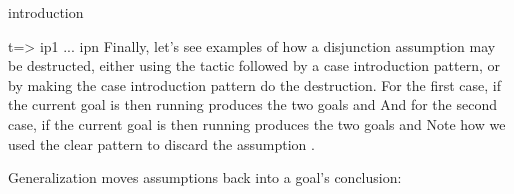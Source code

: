 \begin{tactic}[$t$ =>$\;\iota_1 \cdots \iota_n$]{introduction}
\begin{tsyntax}[empty]{t=> ip1 ... ipn}
    Finally, let's see examples of how a disjunction assumption
    may be destructed, either using the  tactic followed
    by a case introduction pattern, or by making the
    case introduction pattern do the destruction.
    For the first case, if the current goal is
    then running
    produces the two goals
    and
    And for the second case, if the current goal is
    then running
    produces the two goals
    and
    Note how we used the clear pattern to discard the assumption
    .
  \end{tsyntax}
\end{tactic}

Generalization moves assumptions back into a goal's conclusion:

